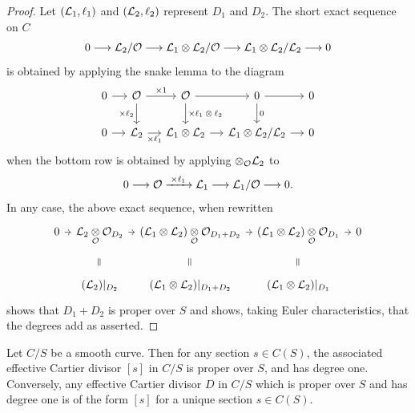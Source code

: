 \begin{proof}
Let $(\mathcal{L}_1, \ell_1)$ and $(\mathcal{L}_2, \ell_2)$ represent $D_1$ and $D_2$. The short exact sequence on $C$
\[
0 \longrightarrow \mathcal{L}_2/\mathcal{O} \longrightarrow \mathcal{L}_1 \otimes \mathcal{L}_2/\mathcal{O} \longrightarrow \mathcal{L}_1 \otimes \mathcal{L}_2/\mathcal{L}_2 \longrightarrow 0
\]
is obtained by applying the snake lemma to the diagram
\[
\begin{tikzcd}[column sep=small, every label/.append style={font=\scriptsize}]
0 \arrow[r] & \cO \arrow[r, "\times 1"] \arrow[d, "\times \ell_2"'] & \cO \arrow[r] \arrow[d, "\times \ell_1 \otimes \ell_2"] & 0 \arrow[r] \arrow[d, "0"] & 0 \\
0 \arrow[r] & \cL_2 \arrow[r, "\times \ell_1"'] & \cL_1 \otimes \cL_2 \arrow[r] & \cL_1 \otimes \cL_2 / \cL_2 \arrow[r] & 0
\end{tikzcd}
\]
when the bottom row is obtained by applying $\otimes_{\mathcal{O}} \mathcal{L}_2$ to
\[
0 \longrightarrow \mathcal{O} \xrightarrow{\;\times \ell_1\;} \mathcal{L}_1 \longrightarrow \mathcal{L}_1/\mathcal{O} \longrightarrow 0.
\]
In any case, the above exact sequence, when rewritten
\[
\begin{tikzcd}[row sep=tiny, column sep=tiny, every label/.append style={font=\scriptsize}]
0 \arrow[r] & \cL_2 \tens{\cO} \cO_{D_2} \arrow[r] & (\cL_1 \otimes \cL_2) \tens{\cO} \cO_{D_1+D_2} \arrow[r] & (\cL_1 \otimes \cL_2) \tens{\cO} \cO_{D_1} \arrow[r] & 0 \\
& \rotatebox{90}{$=$} & \rotatebox{90}{$=$} & \rotatebox{90}{$=$} & \\
& (\cL_2)|_{D_2} & (\cL_1 \otimes \cL_2)|_{D_1+D_2} & (\cL_1 \otimes \cL_2)|_{D_1} &
\end{tikzcd}
\]
shows that $D_1 + D_2$ is proper over $S$ and shows, taking Euler characteristics, that the degrees add as asserted.
\end{proof}

\begin{lemma}\label{lem:1.2.7}
Let $C/S$ be a smooth curve. Then for any section $s \in C(S)$, the associated effective Cartier divisor $[s]$ in $C/S$ is proper over $S$, and has degree one. Conversely, any effective Cartier divisor $D$ in $C/S$ which is proper over $S$ and has degree one is of the form $[s]$ for a unique section $s \in C(S)$.
\end{lemma}

